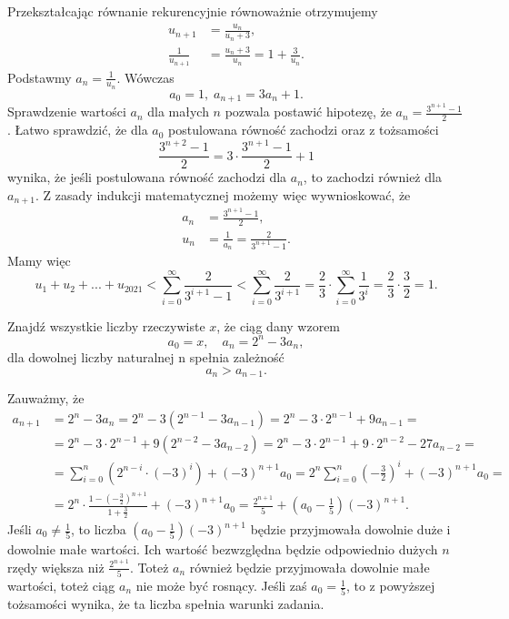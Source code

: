 \noindent
Przekształcając równanie rekurencyjnie równoważnie otrzymujemy
\begin{align*}
	u_{n + 1} &= \frac{u_n}{u_n + 3}, \\
	\frac{1}{u_{n + 1}} &= \frac{u_n + 3}{u_n} = 1 + \frac{3}{u_n}.
\end{align*}
Podstawmy $a_n = \frac{1}{u_n}$. Wówczas
\[
	a_0 = 1, \; a_{n + 1} = 3a_n + 1. 
\]
Sprawdzenie wartości $a_n$ dla małych $n$ pozwala postawić hipotezę, że $a_n = \frac{3^{n + 1} - 1}{2}$. Łatwo sprawdzić, że dla $a_0$ postulowana równość zachodzi oraz z tożsamości
\[
	\frac{3^{n + 2} - 1}{2} = 3 \cdot \frac{3^{n + 1} - 1}{2} + 1
\]
wynika, że jeśli postulowana równość zachodzi dla $a_n$, to zachodzi również dla $a_{n + 1}$. Z zasady indukcji matematycznej możemy więc wywnioskować, że
\begin{align*}
	a_{n} &= \frac{3^{n + 1} - 1}{2}, \\
	u_n &= \frac{1}{a_n} = \frac{2}{3^{n + 1} - 1}.
\end{align*}
Mamy więc
\[
	u_1 + u_2 + ... + u_{2021} < \sum^{\infty}_{i = 0} \frac{2}{3^{i + 1} - 1} < \sum^{\infty}_{i = 0} \frac{2}{3^{i + 1}} = \frac{2}{3} \cdot \sum^{\infty}_{i = 0} \frac{1}{3^{i}} = \frac{2}{3} \cdot \frac{3}{2} = 1.
\]

\begin{problem}{4}
	Znajdź wszystkie liczby rzeczywiste $x$, że ciąg dany wzorem
	\[
		a_0 = x, \quad a_n = 2^n - 3a_n,
	\]
	dla dowolnej liczby naturalnej n spełnia zależność
	\[
		a_{n} > a_{n - 1}.
	\]
\end{problem}

\noindent
Zauważmy, że
\begin{align*}
	a_{n + 1} &= 2^n - 3a_n = 2^n - 3(2^{n - 1} - 3a_{n - 1}) = 2^n - 3 \cdot 2^{n - 1} + 9a_{n - 1} =  \\
	&= 2^n - 3 \cdot 2^{n - 1} + 9(2^{n - 2} - 3a_{n - 2}) = 2^n - 3 \cdot 2^{n - 1} + 9 \cdot 2^{n - 2} - 27a_{n - 2} = \\
	&= \sum^{n}_{i = 0} \left(2^{n - i} \cdot (-3)^i\right) + (-3)^{n + 1}a_0 = 2^n \sum^{n}_{i = 0} \left(-\frac{3}{2}\right)^i + (-3)^{n + 1}a_0 = \\
	&= 2^n \cdot \frac{1 - \left(-\frac{3}{2}\right)^{n + 1}}{1 + \frac{3}{2}} + (-3)^{n + 1}a_0 = \frac{2^{n + 1}}{5} +\left(a_0 - \frac{1}{5}\right)(-3)^{n + 1}.
\end{align*}
Jeśli $a_0 \neq \frac{1}{5}$, to liczba $\left(a_0 - \frac{1}{5}\right)(-3)^{n + 1}$ będzie przyjmowała dowolnie duże i dowolnie małe wartości. Ich wartość bezwzględna będzie odpowiednio dużych $n$ rzędy większa niż $\frac{2^{n + 1}}{5}$. Toteż $a_n$ również będzie przyjmowała dowolnie małe wartości, toteż ciąg $a_n$ nie może być rosnący. Jeśli zaś $a_0 = \frac{1}{5}$, to z powyższej tożsamości wynika, że ta liczba spełnia warunki zadania.

